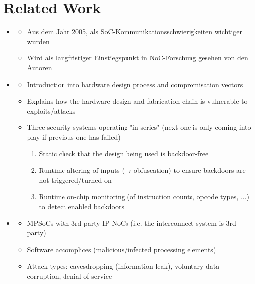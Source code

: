 \documentclass[
	paper=a4,
	fontsize=11pt,
	parskip=full %
]{scrreprt}
\begin{document}
    \chapter{Related Work} %
    \begin{itemize}
        \item \textbf{}
            \begin{itemize}
                \item Aus dem Jahr 2005, als SoC-Kommunikationsschwierigkeiten wichtiger wurden
                \item Wird als langfristiger Einstiegspunkt in NoC-Forschung gesehen von den Autoren
            \end{itemize}
        \item \textbf{}
            \begin{itemize}
                \item Introduction into hardware design process and compromisation vectors
                \item Explains how the hardware design and fabrication chain is vulnerable to exploits/attacks
                \item Three security systems operating "in series" (next one is only coming into play if previous one has failed)
                    \begin{enumerate}
                        \item Static check that the design being used is backdoor-free
                        \item Runtime altering of inputs (→ obfuscation) to ensure backdoors are not triggered/turned on
                        \item Runtime on-chip monitoring (of instruction counts, opcode types, ...) to detect enabled backdoors
                    \end{enumerate}
            \end{itemize}
        \item \textbf{}
            \begin{itemize}
                \item MPSoCs with 3rd party IP NoCs (i.e. the interconnect system is 3rd party)
                \item Software accomplices (malicious/infected processing elements)
                \item Attack types: eavesdropping (information leak), voluntary data corruption, denial of service

\end{itemize}
\end{itemize}
\end{document}
